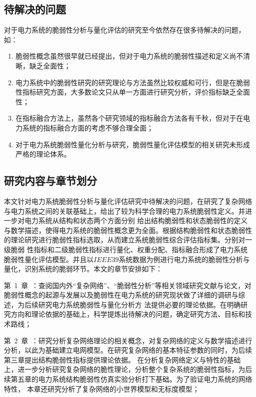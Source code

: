 \subsection{待解决的问题}
\label{sec:research_problem}
对于电力系统的脆弱性分析与量化评估的研究至今依然存在很多待解决的问题，如：
\begin{enumerate}[(1)]
  \item 脆弱性概念虽然很早就已经提出，但对于电力系统的脆弱性描述和定义尚不清晰，缺乏全面性；
  \item 电力系统中的脆弱性研究的研究理论与方法虽然比较权威和可行，但是在脆弱性指标研究方面，大多数论文只从单一方面进行研究分析，评价指标缺乏全面性；
  \item 在指标融合方法上，虽然各个研究领域的指标融合方法各有千秋，但对于在电力系统的指标融合方面的考虑不够合理全面；
  \item 对于电力系统脆弱性量化分析与研究，脆弱性量化评估模型的相关研究未形成严格的理论体系。
 \end{enumerate}

\subsection{研究内容与章节划分}
\label{sec:contendAndIdea}
本文针对电力系统脆弱性分析与量化评估研究中待解决的问题，在研究了复杂网络与电力系统之间的关联基础上，给出了较为科学合理的电力系统脆弱性定义。并进一步对电力系统从结构和状态两个方面分别
给出结构脆弱性和状态脆弱性的定义与数学描述，使得电力系统的脆弱性概念更为全面。根据结构脆弱性和状态脆弱性的理论研究进行脆弱性指标选取，从而建立系统脆弱性综合评估指标集。分别对一级脆弱
性指标和二级脆弱性指标进行量化、权重分配、指标融合形成了电力系统脆弱性量化评估模型。并且以$IEEE39$系统数据为例进行电力系统的脆弱性分析与量化，识别系统的脆弱环节。本文的章节安排如下：

第~1~章~：查阅国内外“复杂网络”、“脆弱性分析”等相关领域研究文献与论文，对脆弱性概念的起源与发展以及脆弱性在电力系统的研究现状做了详细的调研与综述，为后续研究电力系统脆弱性与量化分析方
法提供必要的理论依据。在明确研究方向和理论依据的基础上，科学提炼出待解决的问题，确定研究方法、目标和技术路线；

第~2~章~：研究分析复杂网络理论的相关概念，对复杂网络的定义与数学描述进行分析，以此为基础建立电网模型。在研究复杂网络的基本特征参数的同时，为后续第三章提出结构脆弱性指标提供理论依据。
在分析复杂网络定义与特性的基础上，进一步分析研究复杂网络的脆性理论，分析整个复杂系统的脆弱性指标，为后续第五章的电力系统结构脆弱性仿真实验分析打下基础。为了验证电力系统的网络特性，
本章还研究分析了复杂网络的小世界模型和无标度模型；

